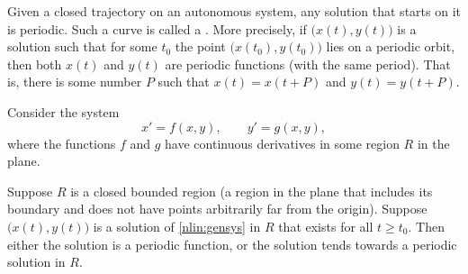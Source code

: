 %

Given a closed trajectory on an autonomous system,
any solution that starts on it is periodic.
Such a curve is called a
\emph{}.
More precisely, if
$\bigl(x(t),y(t)\bigr)$
is a solution such that for some $t_0$ the point
$\bigl(x(t_0),y(t_0)\bigr)$ lies on a periodic orbit, then both $x(t)$ and $y(t)$
are periodic functions (with the same period).  That is, there is some
number $P$ such that $x(t) = x(t+P)$ and $y(t) = y(t+P)$.

Consider the system
\begin{equation} \label{nlin:gensys}
x' = f(x,y), \qquad y' = g(x,y) ,
\end{equation}
where the functions $f$ and $g$ have continuous derivatives in some region
$R$ in the plane.

\begin{theorem}%
Suppose $R$ is a closed bounded region (a region in the plane that includes
its boundary and does not have points arbitrarily far from the origin).
Suppose $\bigl(x(t), y(t)\bigr)$ is a solution of
\eqref{nlin:gensys} in $R$ that exists
for all $t \geq t_0$.  Then either the solution is a periodic function,
or the solution tends towards a periodic solution in $R$.
\end{theorem}

